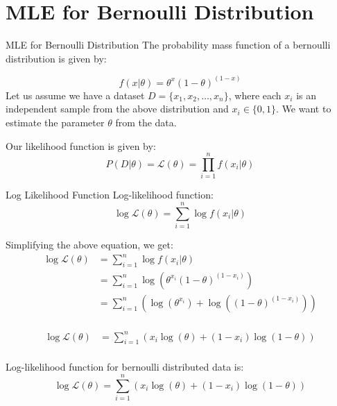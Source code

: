 \documentclass[handout]{beamer}
\begin{document}
\section{MLE for Bernoulli Distribution}
\begin{frame}{MLE for Bernoulli Distribution}
The probability mass function of a bernoulli distribution is given by:

\begin{equation}
f(x|\theta) = \theta^x(1-\theta)^{(1-x)}
\end{equation}
Let us assume we have a dataset $D = \{x_1, x_2, \ldots, x_n\}$, where each $x_i$ is an independent sample from the above distribution and $x_i\in\{0, 1\}$.
We want to estimate the parameter $\theta$ from the data.

Our likelihood function is given by:
\begin{equation}
P(D|\theta) = \mathcal{L}(\theta) = \prod_{i=1}^n f(x_i|\theta)
\end{equation}
\end{frame}

\begin{frame}{Log Likelihood Function}
    Log-likelihood function:
    \begin{equation}
        \log \mathcal{L}(\theta) = \sum_{i=1}^n \log f(x_i|\theta)
    \end{equation}

    Simplifying the above equation, we get:
    \begin{align*}
        \log \mathcal{L}(\theta) &= \sum_{i=1}^n \log f(x_i|\theta) \\
        &= \sum_{i=1}^n \log \left (\theta^{x_{i}}(1-\theta)^{(1-x_{i})} \right) \\
        &= \sum_{i=1}^n \left( \log \left( \theta^{x_{i}} \right) + \log \left( (1-\theta)^{(1-x_{i})}  \right) \right) \\
        \end{align*}
\end{frame}
\begin{frame}
   
    \begin{align*}
        \log \mathcal{L}(\theta) &= \sum_{i=1}^n \left (x_{i}\log \left( \theta \right) + (1-x_{i})\log \left(1-\theta \right) \right)\\
        \end{align*}
        \begin{tcolorbox}[colback=metropolisblue!5,colframe=metropolisblue,title=Log Likelihood Function for Bernoulli Distribution]
            Log-likelihood function for bernoulli distributed data is:
            \[
                \log \mathcal{L}(\theta) = \sum_{i=1}^n  (x_{i}\log(\theta) + (1-x_{i})\log(1-\theta))
                \]
        \end{tcolorbox}
\end{frame}
\end{document}
